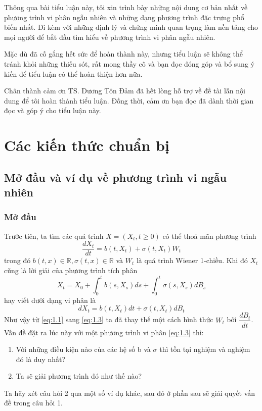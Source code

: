 \documentclass[a4paper]{article}
\numberwithin{equation}{section}
\begin{document}
Thông qua bài tiểu luận này, tôi xin trình bày những nội dung cơ bản nhất về phương trình vi phân ngẫu nhiên và những dạng phương trình đặc trưng phổ biến nhất. Đi kèm với những định lý và chứng minh quan trọng làm nền tảng cho mọi người để bắt đầu tìm hiểu về phương trình vi phân ngẫu nhiên.

Mặc dù đã cố gắng hết sức để hoàn thành này, nhưng tiểu luận sẽ không thể tránh khỏi những thiếu sót, rất mong thầy cô và bạn đọc đóng góp và bổ sung ý kiến để tiểu luận có thể hoàn thiện hơn nữa.

Chân thành cảm ơn TS. Dương Tôn Đảm đã hết lòng hỗ trợ về đề tài lẫn nội dung để tôi hoàn thành tiểu luận. Đồng thời, cảm ơn bạn đọc đã dành thời gian đọc và góp ý cho tiểu luận này.
\newpage
\section{Các kiến thức chuẩn bị}
\subsection{Mở đầu và ví dụ về phương trình vi ngẫu nhiên}
\subsubsection{Mở đầu}
Trước tiên, ta tìm các quá trình $X=(X_t,t\geq 0)$ có thể thoả mãn phương trình
\begin{equation}\label{eq:1.1}
	\dfrac{dX_t}{dt}=b(t,X_t)+\sigma(t,X_t)W_t
\end{equation}
trong đó $b(t,x)\in\mathbb{R},\sigma(t,x)\in\mathbb{R}$ và $W_t$ là quá trình Wiener 1-chiều. Khi đó $X_t$ cũng là lời giải của phương trình tích phân
\begin{equation}\label{eq:1.2}
	X_t=X_0+\int_0^tb(s,X_s)ds+\int_0^t\sigma(s,X_s)dB_s
\end{equation}
hay viết dưới dạng vi phân là
\begin{equation}\label{eq:1.3}
	dX_t=b(t,X_t)dt+\sigma(t,X_t)dB_t
\end{equation}
Như vậy từ \eqref{eq:1.1} sang \eqref{eq:1.3} ta đã thay thế một cách hình thức $W_t$ bởi $\dfrac{dB_t}{dt}$. Vấn đề đặt ra lúc này với một phương trình vi phân \eqref{eq:1.3} thì:
\begin{enumerate}[(1)]
	\item Với những điều kiện nào của các hệ số b và $\sigma$ thì tồn tại nghiệm và nghiệm đó là duy nhất?
	\item Ta sẽ giải phương trình đó như thế nào?
\end{enumerate}
Ta hãy xét câu hỏi 2 qua một số ví dụ khác, sau đó ở phần sau sẽ giải quyết vấn đề trong câu hỏi 1.
\end{document}
